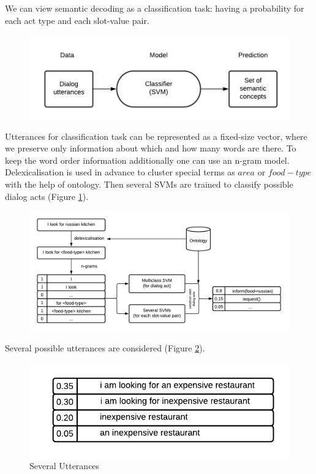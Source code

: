 \documentclass[12pt,titlepage,a4paper]{article}
\begin{document}
We can view semantic decoding as a classification task: having a probabi\-lity for each act type and each slot-value pair.

\begin{figure}[h!]
    \includegraphics[width=\linewidth]{training-2.png}
    \caption{}
\end{figure}

Utterances for classification task can be represented as a fixed-size vector, where we preserve only information about which and how many words are there. To keep the word order information additionally one can use an n-gram model. Delexicalisation is used in advance to cluster special terms as $area$ or $food-type$ with the help of ontology. Then several SVMs are trained to classify possible dialog acts (Figure \ref{fig:semantic-decoding-classification}).

\begin{figure}[h!]
    \includegraphics[width=0.998\textwidth]{semantic-decoding-classification.png}
    \label{fig:semantic-decoding-classification}
\end{figure}

Several possible utterances are considered (Figure \ref{several}).
\begin{figure}[h!]
    \centering
    \includegraphics{uncertanty.png}
    \caption{Several Utterances}
    \label{several}
\end{figure}
\end{document}
